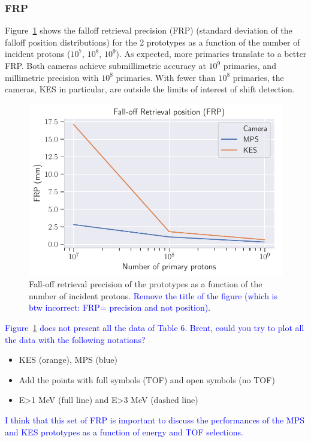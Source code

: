 \documentclass[a4paper,english,12pt]{article}
\newcommand{\et}[2][blue]{\textcolor{#1}{#2}}
\begin{document}
\subsubsection{FRP}

Figure~\ref{fig:PCFRPComp} shows the falloff retrieval precision (FRP) (standard deviation of the falloff position distributions) for the 2 prototypes as a function of the number of incident protons ($10^7$, $10^8$, $10^9$). As expected, more primaries translate to a better FRP. Both cameras achieve submillimetric accuracy at $10^9$ primaries, and millimetric precision with $10^8$ primaries. With fewer than $10^8$ primaries, the cameras, KES in particular, are outside the limits of interest of shift detection.

\begin{figure}[!htp]
  \centering
  \includegraphics[width=.8\textwidth]{pc_frp_plot}
	\caption{\label{fig:PCFRPComp}Fall-off retrieval precision of the prototypes as a function of the number of incident protons. \et{Remove the title of the figure (which is btw incorrect: FRP= precision and not position).}}
\end{figure}

\et{Figure~\ref{fig:PCFRPComp} does not present all the data of Table 6. Brent, could you try to plot all the data with the following notations?}
	\begin{itemize}
		\item KES (orange), MPS (blue)
		\item Add the points with full symbols (TOF) and open symbols (no TOF)
		\item E>1 MeV (full line) and E>3 MeV (dashed line)
	\end{itemize}
	\et{I think that this set of FRP is important to discuss the performances of the MPS and KES prototypes as a function of energy and TOF selections.}
\end{document}

